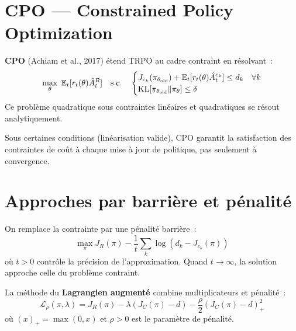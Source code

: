 \section{CPO --- Constrained Policy Optimization}

\begin{definition}[CPO]
\textbf{CPO} (Achiam et al., 2017) \'etend TRPO au cadre contraint en r\'esolvant~:
\[
    \max_\theta \; \mathbb{E}_t[r_t(\theta) \hat{A}_t^R] \quad \text{s.c.} \quad
    \begin{cases}
        J_{c_k}(\pi_{\theta_{\text{old}}}) + \mathbb{E}_t[r_t(\theta) \hat{A}_t^{c_k}] \leq d_k & \forall k \\
        \text{KL}[\pi_{\theta_{\text{old}}} \| \pi_\theta] \leq \delta
    \end{cases}
\]
Ce probl\`eme quadratique sous contraintes lin\'eaires et quadratiques se r\'esout
analytiquement.
\end{definition}

\begin{theoreme}
Sous certaines conditions (lin\'earisation valide), CPO garantit la satisfaction
des contraintes de co\^ut \`a chaque mise \`a jour de politique, pas seulement
\`a convergence.
\end{theoreme}

\section{Approches par barri\`ere et p\'enalit\'e}

\begin{definition}
On remplace la contrainte par une p\'enalit\'e barri\`ere~:
\[
    \max_\pi J_R(\pi) - \frac{1}{t} \sum_k \log(d_k - J_{c_k}(\pi))
\]
o\`u $t > 0$ contr\^ole la pr\'ecision de l'approximation. Quand $t \to \infty$,
la solution approche celle du probl\`eme contraint.
\end{definition}

\begin{definition}
La m\'ethode du \textbf{Lagrangien augment\'e} combine multiplicateurs et p\'enalit\'e~:
\[
    \mathcal{L}_\rho(\pi, \lambda) = J_R(\pi) - \lambda(J_C(\pi) - d)
    - \frac{\rho}{2}(J_C(\pi) - d)_+^2
\]
o\`u $(x)_+ = \max(0, x)$ et $\rho > 0$ est le param\`etre de p\'enalit\'e.
\end{definition}

